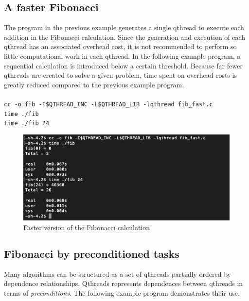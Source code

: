 \documentclass[12pt,fullpage]{article}
\begin{document}
\subsection{A faster Fibonacci}
The program in the previous example generates a single qthread to execute each addition in the Fibonacci calculation.  Since the generation and execution of each qthread has an associated overhead cost, it is not recommended to perform so little computational work in each qthread.  In the following example program, a sequential calculation is introduced below a certain threshold. Because far fewer qthreads are created to solve a given problem, time spent on overhead costs is greatly reduced compared to the previous example program.
\\  \\
{\footnotesize{\tt cc -o fib -I\$QTHREAD\_INC -L\$QTHREAD\_LIB -lqthread fib\_fast.c}}
\\
{\footnotesize{\tt time ./fib}}
\\
{\footnotesize{\tt time ./fib 24}}

\begin{figure}[h]
\includegraphics[scale=0.90]{images/fib_fast.png}
\caption{Faster version of the Fibonacci calculation}
\end{figure}

\newpage


\subsection{Fibonacci by preconditioned tasks}

Many algorithms can be structured as a set of qthreads partially ordered by dependence relationships.  Qthreads represents dependences between qthreads in terms of {\it preconditions}.  The following example program demonstrates their use.
\\
\end{document}

